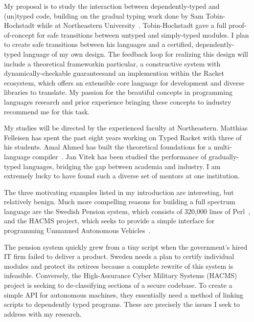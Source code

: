 \documentclass[12pt]{article}
\newcommand{\hdr}[2]{\vspace{-0.4cm}{\flushleft{\hrulefill\\\textbf{#1}\hfill{#2}\\\vspace{-0.2cm}\hrulefill}}\vspace{0.1cm}}
\begin{document}
My proposal is to study the interaction between dependently-typed and (un)typed code, building on the gradual typing work done by Sam Tobin-Hochstadt while at Northeastern University~\cite{tobin2010typed}.
Tobin-Hochstadt gave a full proof-of-concept for safe transitions between untyped and simply-typed modules.
I plan to create safe transitions between his languages and a certified, dependently-typed language of my own design.
The feedback loop for realizing this design will include a theoretical framework\textemdash in particular, a constructive system with dynamically-checkable guarantees\textemdash and an implemention within the Racket ecosystem, which offers an extensible core language for development and diverse libraries to translate.
My passion for the beautiful concepts in programming languages research and prior experience bringing these concepts to industry recommend me for this task.

My studies will be directed by the experienced faculty at Northeastern.
Matthias Felleisen has spent the past eight years working on Typed Racket with three of his students.
Amal Ahmed has built the theoretical foundations for a multi-language compiler~\cite{perconti2014verifying}.
Jan Vitek has been studied the performance of gradually-typed languages, bridging the gap between academia and industry.
I am extremely lucky to have found such a diverse set of mentors at one institution.

\newpage

\hdr{Broader Impacts}{}

The three motivating examples listed in my introduction are interesting, but relatively benign.
Much more compelling reasons for building a full spectrum language are the Swedish Pension system, which consists of 320,000 lines of Perl~\cite{jantalk}, and the HACMS project, which seeks to provide a simple interface for programming Unmanned Autonomous Vehicles~\cite{hacms}.

The pension system quickly grew from a tiny script when the government's hired IT firm failed to deliver a product.
Sweden needs a plan to certify individual modules and protect its retirees because a complete rewrite of this system is infeasible.
Conversely, the High-Assurance Cyber Military Systems (HACMS) project is seeking to de-classifying sections of a secure codebase.
To create a simple API for autonomous machines, they essentially need a method of linking scripts to dependently typed programs.
These are precisely the issues I seek to address with my research.
\end{document}

